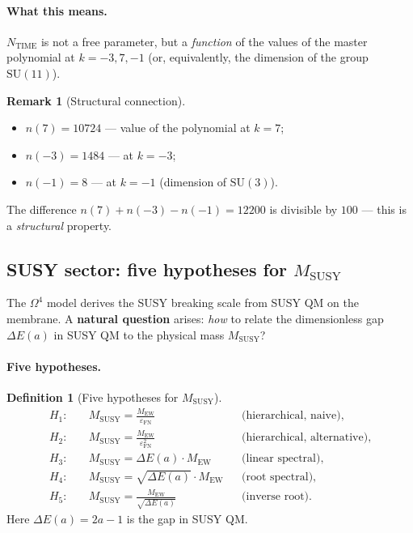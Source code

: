 \documentclass[11pt,a4paper]{article}
\newcommand{\SU}{\mathrm{SU}}
\newcommand{\Om}{\Omega^4}
\newcommand{\MEW}{M_{\text{EW}}}
\newcommand{\MSUSY}{M_{\text{SUSY}}}
\newcommand{\epsFN}{\varepsilon_{\text{FN}}}
\theoremstyle{definition}
\newtheorem{definition}[theorem]{Definition}
\newtheorem{remark}[theorem]{Remark}
\begin{document}
\paragraph{What this means.}
$N_{\text{TIME}}$ is not a free parameter, but a \emph{function} of the 
values of the master polynomial at $k = -3, 7, -1$ (or, equivalently, 
the dimension of the group $\SU(11)$).

\begin{remark}[Structural connection]
\label{rem:time-structural}
\begin{itemize}
    \item $n(7) = 10724$ — value of the polynomial at $k = 7$;
    \item $n(-3) = 1484$ — at $k = -3$;
    \item $n(-1) = 8$ — at $k = -1$ (dimension of $\SU(3)$).
\end{itemize}
The difference $n(7) + n(-3) - n(-1) = 12200$ is divisible by $100$ — 
this is a \emph{structural} property.
\end{remark}

\subsection{SUSY sector: five hypotheses for \texorpdfstring{$\MSUSY$}{M\_SUSY}}
\label{subsec:susy-hypotheses-review}

The $\Om$ model derives the SUSY breaking scale from SUSY QM 
on the membrane. A \textbf{natural question} arises: \emph{how} 
to relate the dimensionless gap $\Delta E(a)$ in SUSY QM to the physical 
mass $\MSUSY$?

\paragraph{Five hypotheses.}
\begin{definition}[Five hypotheses for $\MSUSY$]
\label{def:five-hypotheses-review}
\begin{align}
    H_1:&\quad \MSUSY = \frac{\MEW}{\epsFN} 
    && \text{(hierarchical, naive)}, \\
    H_2:&\quad \MSUSY = \frac{\MEW}{\epsFN^2} 
    && \text{(hierarchical, alternative)}, \\
    H_3:&\quad \MSUSY = \Delta E(a) \cdot \MEW 
    && \text{(linear spectral)}, \\
    H_4:&\quad \MSUSY = \sqrt{\Delta E(a)} \cdot \MEW 
    && \text{(root spectral)}, \\
    H_5:&\quad \MSUSY = \frac{\MEW}{\sqrt{\Delta E(a)}} 
    && \text{(inverse root)}.
\end{align}
Here $\Delta E(a) = 2a - 1$ is the gap in SUSY QM.
\end{definition}
\end{document}
